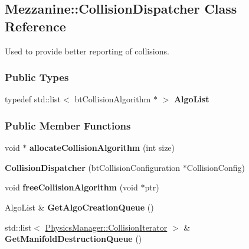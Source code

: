 \hypertarget{classMezzanine_1_1CollisionDispatcher}{
\subsection{Mezzanine::CollisionDispatcher Class Reference}
\label{classMezzanine_1_1CollisionDispatcher}
}


Used to provide better reporting of collisions.  


\subsubsection*{Public Types}
\begin{DoxyCompactItemize}
\item 
\hypertarget{classMezzanine_1_1CollisionDispatcher_a0fd318aa1057f8b48f79b28e0fc3783f}{
typedef std::list$<$ btCollisionAlgorithm $\ast$ $>$ {\bfseries AlgoList}}
\label{classMezzanine_1_1CollisionDispatcher_a0fd318aa1057f8b48f79b28e0fc3783f}

\end{DoxyCompactItemize}
\subsubsection*{Public Member Functions}
\begin{DoxyCompactItemize}
\item 
\hypertarget{classMezzanine_1_1CollisionDispatcher_ae384ed995cba028d6e7bd57098d2f67d}{
void $\ast$ {\bfseries allocateCollisionAlgorithm} (int size)}
\label{classMezzanine_1_1CollisionDispatcher_ae384ed995cba028d6e7bd57098d2f67d}

\item 
\hypertarget{classMezzanine_1_1CollisionDispatcher_a9aa6ea6e6c0aaa308a5693062ccf6568}{
{\bfseries CollisionDispatcher} (btCollisionConfiguration $\ast$CollisionConfig)}
\label{classMezzanine_1_1CollisionDispatcher_a9aa6ea6e6c0aaa308a5693062ccf6568}

\item 
\hypertarget{classMezzanine_1_1CollisionDispatcher_a7f5296daba765a8b1c258239f519c021}{
void {\bfseries freeCollisionAlgorithm} (void $\ast$ptr)}
\label{classMezzanine_1_1CollisionDispatcher_a7f5296daba765a8b1c258239f519c021}

\item 
\hypertarget{classMezzanine_1_1CollisionDispatcher_accdd6570d86d41be9bc1672254d15ff9}{
AlgoList \& {\bfseries GetAlgoCreationQueue} ()}
\label{classMezzanine_1_1CollisionDispatcher_accdd6570d86d41be9bc1672254d15ff9}

\item 
\hypertarget{classMezzanine_1_1CollisionDispatcher_aa401c7c3c50f72578df60609f9cce02e}{
std::list$<$ \hyperlink{classMezzanine_1_1PhysicsManager_a930a032df1bf01b9f93ba4e815a433c2}{PhysicsManager::CollisionIterator} $>$ \& {\bfseries GetManifoldDestructionQueue} ()}
\label{classMezzanine_1_1CollisionDispatcher_aa401c7c3c50f72578df60609f9cce02e}

\end{DoxyCompactItemize}
